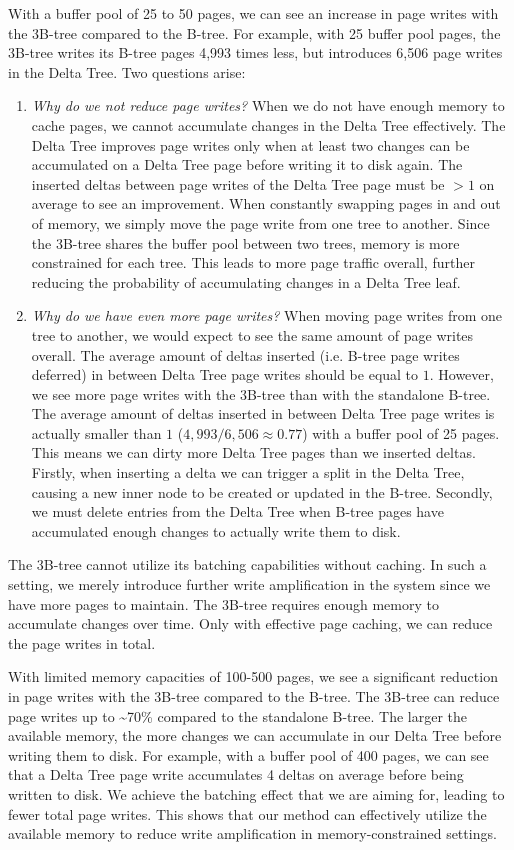 With a buffer pool of 25 to 50 pages, we can see an increase in page writes with the 3B-tree compared to the B-tree.
For example, with 25 buffer pool pages, the 3B-tree writes its B-tree pages 4,993 times less, but introduces 6,506 page writes in the Delta Tree.
Two questions arise:
\begin{enumerate}
  \item \textit{Why do we not reduce page writes?}
  When we do not have enough memory to cache pages, we cannot accumulate changes in the Delta Tree effectively.
  The Delta Tree improves page writes only when at least two changes can be accumulated on a Delta Tree page before writing it to disk again.
  The inserted deltas between page writes of the Delta Tree page must be $>1$ on average to see an improvement.
  When constantly swapping pages in and out of memory, we simply move the page write from one tree to another.
  Since the 3B-tree shares the buffer pool between two trees, memory is more constrained for each tree.
  This leads to more page traffic overall, further reducing the probability of accumulating changes in a Delta Tree leaf.
  \item \textit{Why do we have even more page writes?}
  When moving page writes from one tree to another, we would expect to see the same amount of page writes overall.
  The average amount of deltas inserted (i.e. B-tree page writes deferred) in between Delta Tree page writes should be equal to $1$.
  However, we see more page writes with the 3B-tree than with the standalone B-tree.
  The average amount of deltas inserted in between Delta Tree page writes is actually smaller than $1$ ($4,993 / 6,506 \approx 0.77$) with a buffer pool of 25 pages.
  This means we can dirty more Delta Tree pages than we inserted deltas. 
  Firstly, when inserting a delta we can trigger a split in the Delta Tree, causing a new inner node to be created or updated in the B-tree. 
  Secondly, we must delete entries from the Delta Tree when B-tree pages have accumulated enough changes to actually write them to disk.
\end{enumerate}

The 3B-tree cannot utilize its batching capabilities without caching.
In such a setting, we merely introduce further write amplification in the system since we have more pages to maintain.
The 3B-tree requires enough memory to accumulate changes over time.
Only with effective page caching, we can reduce the page writes in total.

With limited memory capacities of 100-500 pages, we see a significant reduction in page writes with the 3B-tree compared to the B-tree.
The 3B-tree can reduce page writes up to \textasciitilde70\% compared to the standalone B-tree.
The larger the available memory, the more changes we can accumulate in our Delta Tree before writing them to disk.
For example, with a buffer pool of 400 pages, we can see that a Delta Tree page write accumulates 4 deltas on average before being written to disk.
We achieve the batching effect that we are aiming for, leading to fewer total page writes.
This shows that our method can effectively utilize the available memory to reduce write amplification in memory-constrained settings.

